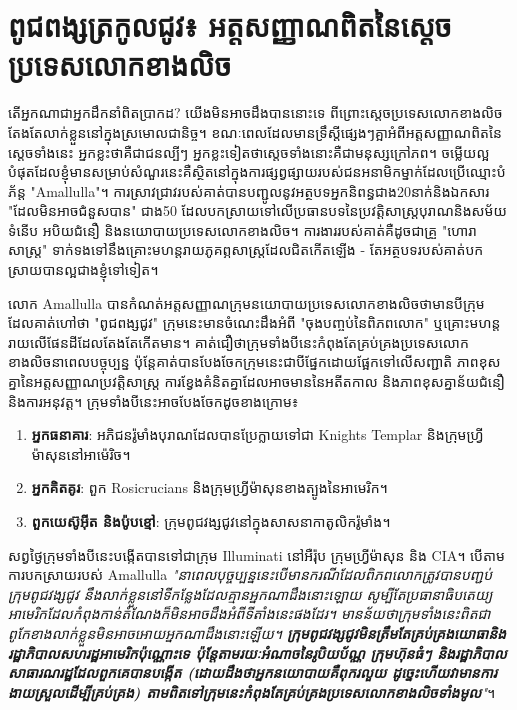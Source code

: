 \documentclass[10pt,twocolumn,letterpaper]{article}
\begin{document}
\section{ពូជពង្សត្រកូល​ជូវ៖ អត្តសញ្ញាណពិតនៃស្តេចប្រទេសលោកខាងលិច}

	តើអ្នកណាជាអ្នកដឹកនាំពិតប្រាកដ? យើងមិនអាចដឹងបាននោះទេ ពីព្រោះស្តេចប្រទេសលោកខាងលិចតែងតែលាក់ខ្លួននៅក្នុងស្រមោលជានិច្ច។ ខណៈពេលដែលមានទ្រឹស្ដីផ្សេងៗគ្អាអំពីអត្តសញ្ញាណពិតនៃស្តេចទាំងនេះ អ្នកខ្លះថាគឺជាជនល្បីៗ អ្នកខ្លះទៀតថាស្តេចទាំងនោះគឺជាមនុស្សក្រៅភព។ ចម្លើយល្អបំផុតដែលខ្ញុំមានសម្រាប់សំណួរនេះគឺស្ថិតនៅក្នុងការផ្សព្វផ្សាយរបស់ជនអនាមិកម្នាក់ដែលប្រើឈ្មោះបំភ័ន្ត "Amallulla"។ ការស្រាវជ្រាវរបស់គាត់បានបញ្ជូលនូវអត្ថបទអ្នកនិពន្ធជាង20នាក់និងឯកសារ "ដែលមិនអាចជំនួសបាន" ជាង50 ដែលបកស្រាយទៅលើប្រធានបទនៃប្រវត្តិសាស្ត្របុរាណនិងសម័យទំនើប អបិយជំនឿ និងនយោបាយប្រទេសលោកខាងលិច\cite{33,34}។ ការងាររបស់គាត់គឺដូចជាគ្រួ "ហោរាសាស្រ្ត" ទាក់ទងទៅនឹងគ្រោះមហន្តរាយភូគព្ភសាស្ត្រដែលជិតកើតឡើង - តែអត្ថបទរបស់គាត់​\textit{} បកស្រាយបានល្អជាងខ្ញុំទៅទៀត។

	លោក Amallulla បានកំណត់អត្តសញ្ញាណក្រុមនយោបាយប្រទេសលោកខាងលិចថាមានបីក្រុម ដែលគាត់ហៅថា "ពូជពង្សជូវ" ក្រុមនេះមានចំណេះដឹងអំពី "ចុងបញ្ចប់នៃពិភពលោក" ឬគ្រោះមហន្តរាយលើផែនដីដែលតែងតែកើតមាន។ គាត់ជឿថាក្រុមទាំងបីនេះកំពុងតែគ្រប់គ្រងប្រទេសលោកខាងលិចនាពេលបច្ចុប្បន្ន ប៉ុន្តែគាត់បានបែងចែកក្រុមនេះជាបីផ្នែកដោយផ្អែកទៅលើសញ្ជាតិ ភាពខុសគ្នានៃអត្តសញ្ញាណប្រវត្តិសាស្ត្រ ការខ្វែងគំនិតគ្នាដែលអាចមាននៃអតីតកាល និងភាពខុសគ្នាន័យជំនឿនិងការអនុវត្ត។
	ក្រុមទាំងបីនេះអាចបែងចែកដូចខាងក្រោម៖
\begin{flushleft}
\begin{enumerate}
    \item \textbf{អ្នកធនាគារ}: អភិជនរ៉ូមាំងបុរាណដែលបានប្រែក្លាយទៅជា Knights Templar និងក្រុមហ្វ្រីម៉ាសុននៅអាម៉េរិច។
    \item \textbf{អ្នកគិតគូរ}: ពួក Rosicrucians និងក្រុមហ្វ្រីម៉ាសុនខាងត្បូងនៃអាមេរិក។
    \item \textbf{ពួកយេស៊ូអ៊ីត និងប៉ូបខ្មៅ}: ក្រុមពូជវង្សជូវនៅក្នុងសាសនាកាតូលិករ៉ូមាំង។
\end{enumerate}
\end{flushleft}
	សព្វថ្ងៃក្រុមទាំងបីនេះបង្កើតបានទៅជាក្រុម Illuminati នៅអឺរ៉ុប ក្រុមហ្វ្រីម៉ាសុន និង CIA។ បើតាមការបកស្រាយរបស់ Amallulla \textit{"នាពេលបុច្ចប្បន្ននេះបើមានករណីដែលពិភពលោកត្រូវបានបញ្ជប់  ក្រុមពូជវង្សជូវ នឹងលាក់ខ្លួននៅទីកន្លែងដែលគ្មានអ្នកណាដឹងនោះឡោយ សូម្បីតែប្រធានាធិបតេយ្យអាមេរិកដែលកំពុងកាន់តំណែងក៏មិនអាចដឹងអំពីទីតាំងនេះផងដែរ។ មានន័យថាក្រុមទាំងនេះពិតជាពូកែខាងលាក់ខ្លួនមិនអាចអោយអ្នកណាដឹងនោះឡើយ។ \textbf{ក្រុមពូជវង្សជូវមិនត្រឹមតែគ្រប់គ្រងយោធានិងរដ្ឋាភិបាលសហរដ្ឋអាមេរិកប៉ុណ្ណោះទេ ប៉ុន្តែតាមរយៈអំណាចនៃរូបិយប័ណ្ណ ក្រុមហ៊ុនធំៗ និងរដ្ឋាភិបាលសាធារណរដ្ឋដែលពួកគេបានបង្កើត (ដោយដឹងថាអ្នកនយោបាយគឺពុករលួយ ដូច្នេះហើយវាមានការងាយស្រួលដើម្បីគ្រប់គ្រង) តាមពិតទៅក្រុមនេះកំពុងតែគ្រប់គ្រងប្រទេសលោកខាងលិចទាំងមូល}"}\cite{33,34}។
\end{document}
